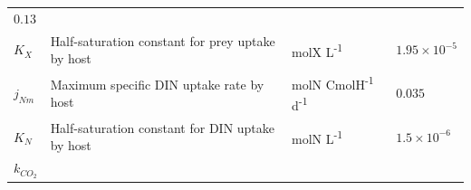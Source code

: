 \documentclass[]{elsarticle} %
\begin{document}
\begin{longtable}[c]{@{}llll@{}}
\begin{minipage}[t]{0.10\columnwidth}\raggedright\strut
\(0.13\)
\strut\end{minipage}\tabularnewline
\begin{minipage}[t]{0.10\columnwidth}\raggedright\strut
\(K_X\)
\strut\end{minipage} &
\begin{minipage}[t]{0.48\columnwidth}\raggedright\strut
Half-saturation constant for prey uptake by host
\strut\end{minipage} &
\begin{minipage}[t]{0.25\columnwidth}\raggedright\strut
molX L\textsuperscript{-1}
\strut\end{minipage} &
\begin{minipage}[t]{0.10\columnwidth}\raggedright\strut
\(1.95\times 10^{-5}\)
\strut\end{minipage}\tabularnewline
\begin{minipage}[t]{0.10\columnwidth}\raggedright\strut
\(j_{Nm}\)
\strut\end{minipage} &
\begin{minipage}[t]{0.48\columnwidth}\raggedright\strut
Maximum specific DIN uptake rate by host
\strut\end{minipage} &
\begin{minipage}[t]{0.25\columnwidth}\raggedright\strut
molN CmolH\textsuperscript{-1} d\textsuperscript{-1}
\strut\end{minipage} &
\begin{minipage}[t]{0.10\columnwidth}\raggedright\strut
\(0.035\)
\strut\end{minipage}\tabularnewline
\begin{minipage}[t]{0.10\columnwidth}\raggedright\strut
\(K_N\)
\strut\end{minipage} &
\begin{minipage}[t]{0.48\columnwidth}\raggedright\strut
Half-saturation constant for DIN uptake by host
\strut\end{minipage} &
\begin{minipage}[t]{0.25\columnwidth}\raggedright\strut
molN L\textsuperscript{-1}
\strut\end{minipage} &
\begin{minipage}[t]{0.10\columnwidth}\raggedright\strut
\(1.5\times 10^{-6}\)
\strut\end{minipage}\tabularnewline
\begin{minipage}[t]{0.10\columnwidth}\raggedright\strut
\(k_{CO_2}\)
\strut\end{minipage} &

\end{longtable}
\end{document}
